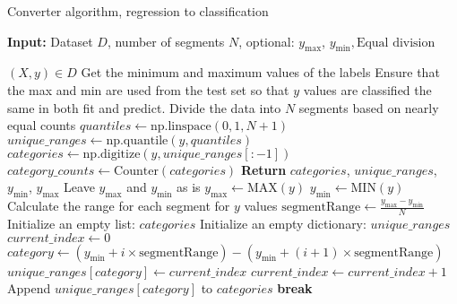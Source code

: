 \documentclass[a4paper, 12pt]{report}
\begin{document}
\begin{algorithm}[H]
    \caption{Converter algorithm, regression to classification}
    \label{alg:LingerImplicitRegressor_regression_values_to_classification_values}
    \textbf{Input:} Dataset $D$, number of segments $N$, optional: $y_{\text{max}}$, $y_{\text{min}}, \text{Equal division}$
    \begin{algorithmic}[1]
    \State $(X, y) \in D$
    \State Get the minimum and maximum values of the labels
    \State Ensure that the max and min are used from the test set so that $y$ values are classified the same in both fit and predict.
        \State Divide the data into $N$ segments based on nearly equal counts
        \State $quantiles \gets \text{np.linspace}(0, 1, N+1)$
            \State $unique\_ranges \gets \text{np.quantile}(y, quantiles)$
        \EndIf
        \State $categories \gets \text{np.digitize}(y, unique\_ranges[:-1])$
        \State $category\_counts \gets \text{Counter}(categories)$
        \State \textbf{Return} $categories$, $unique\_ranges$, $y_{\text{min}}$, $y_{\text{max}}$
    \Else
            \State Leave $y_{\text{max}}$ and $y_{\text{min}}$ as is
        \Else
            \State $y_{\text{max}} \gets \text{MAX}(y)$
            \State $y_{\text{min}} \gets \text{MIN}(y)$
        \EndIf
        \State Calculate the range for each segment for $y$ values
        \State $\text{segmentRange} \gets \frac{y_{\text{max}} - y_{\text{min}}}{N}$
        \State Initialize an empty list: $categories$
        \State Initialize an empty dictionary: $unique\_ranges$
        \State $current\_index \gets 0$
                        \State $category \gets (y_{\text{min}} + i \times \text{segmentRange}) - (y_{\text{min}} + (i + 1) \times \text{segmentRange})$
                            \State $unique\_ranges[category] \gets current\_index$
                            \State $current\_index \gets current\_index + 1$
                        \EndIf
                        \State Append $unique\_ranges[category]$ to $categories$
                        \State \textbf{break}
                    \EndIf
                \Else

\end{algorithmic}
\end{algorithm}
\end{document}
